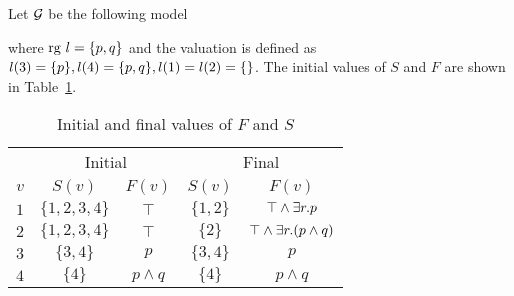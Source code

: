 \begin{ex}
Let $\mathcal{G}$ be the following model
\begin{center}
\end{center}
%
where ${\rm rg}\ l=\{p,q\}$ and the valuation is defined as
$l(3)=\{p\}, l(4)=\{p,q\}, l(1)=l(2)=\{\}$. The initial values of $S$ and $F$ are
shown in Table~\ref{tab:example}.

\begin{table}[ht]
\centering
{\footnotesize
\begin{tabular}{|c|c|c|c|c|}
\hline
&\multicolumn{2}{|c|}{Initial}&\multicolumn{2}{|c|}{Final}\\
$v$ & $S(v)$ & $F(v)$ & $S(v)$&$F(v)$\\
\hline
$1$ & $\{1,2,3,4\}$ & $\top$ & $\{1,2\}$&$\top\wedge\exists r. p$\\
$2$ & $\{1,2,3,4\}$ & $\top$ & $\{2\}$&$\top\wedge\exists r.(p\wedge q)$\\
$3$ & $\{3,4\}$ & $p$ & $\{3,4\}$ &$p$\\
$4$ & $\{4\}$ & $p\wedge q$ & $\{4\}$&$p\wedge q$\\
\hline
\end{tabular}
\caption{Initial and final values of $F$ and $S$}\label{tab:example}
}
\end{table}


\end{ex}
